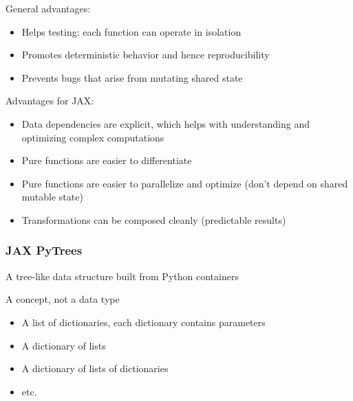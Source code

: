 \begin{frame}

    General advantages:

    \begin{itemize}
        \item Helps testing: each function can operate in isolation
        \vspace{0.5em}
        \item Promotes deterministic behavior and hence reproducibility
        \vspace{0.5em}
        \item Prevents bugs that arise from mutating shared state
    \end{itemize}

\end{frame}



\begin{frame}
    
    Advantages for JAX:

     \begin{itemize}
        \item Data dependencies are explicit, which helps with understanding and optimizing complex computations 
        \vspace{0.5em}
         \item Pure functions are easier to differentiate 
        \vspace{0.5em}
         \item Pure functions are easier to parallelize and optimize (don't
             depend on shared mutable state)
        \vspace{0.5em}
         \item Transformations can be composed cleanly (predictable results)
     \end{itemize}


\end{frame}

\begin{frame}
    \frametitle{JAX PyTrees}

    A tree-like data structure built from Python containers

    \vspace{0.5em}
    A concept, not a data type

    \vspace{0.5em}
    \vspace{0.5em}
    \vspace{0.5em}
    \Egs

    \begin{itemize}
        \item A list of dictionaries, each dictionary contains parameters
        \item A dictionary of lists 
        \item A dictionary of lists of dictionaries
        \item etc.
    \end{itemize}

\end{frame}



